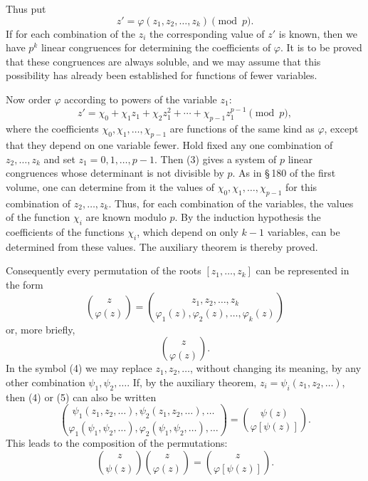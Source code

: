 \documentclass[11pt]{article}
\begin{document}
Thus put
\begin{equation}
 z'=\varphi(z_1,z_2,\ldots,z_k)\pmod p.
 \tag{2}
\end{equation}
If for each combination of the $z_i$ the corresponding value of $z'$ is known, then we have $p^k$ linear congruences for determining the coefficients of $\varphi$. It is to be proved that these congruences are always soluble, and we may assume that this possibility has already been established for functions of fewer variables.

Now order $\varphi$ according to powers of the variable $z_1$:
\begin{equation}
 z'=\chi_0+\chi_1z_1+\chi_2z_1^2+\cdots+\chi_{p-1}z_1^{p-1}\pmod p,
 \tag{3}
\end{equation}
where the coefficients $\chi_0,\chi_1,\ldots,\chi_{p-1}$ are functions of the same kind as $\varphi$, except that they depend on one variable fewer. Hold fixed any one combination of $z_2,\ldots,z_k$ and set $z_1=0,1,\ldots,p-1$. Then (3) gives a system of $p$ linear congruences whose determinant is not divisible by $p$. As in \S\,180 of the first volume, one can determine from it the values of $\chi_0,\chi_1,\ldots,\chi_{p-1}$ for this combination of $z_2,\ldots,z_k$. Thus, for each combination of the variables, the values of the function $\chi_i$ are known modulo $p$. By the induction hypothesis the coefficients of the functions $\chi_i$, which depend on only $k-1$ variables, can be determined from these values. The auxiliary theorem is thereby proved.

Consequently every permutation of the roots $[z_1,\ldots,z_k]$ can be represented in the form
\begin{equation}
 \binom{z}{\varphi(z)}
 =
 \binom{z_1,z_2,\ldots,z_k}{\varphi_1(z),\varphi_2(z),\ldots,\varphi_k(z)}
 \tag{4}
\end{equation}
or, more briefly,
\begin{equation}
 \binom{z}{\varphi(z)}.
 \tag{5}
\end{equation}
In the symbol (4) we may replace $z_1,z_2,\ldots$, without changing its meaning, by any other combination $\psi_1,\psi_2,\ldots$. If, by the auxiliary theorem, $z_i=\psi_i(z_1,z_2,\ldots)$, then (4) or (5) can also be written
\begin{equation}
 \binom{\psi_1(z_1,z_2,\ldots),\psi_2(z_1,z_2,\ldots),\ldots}
       {\varphi_1(\psi_1,\psi_2,\ldots),\varphi_2(\psi_1,\psi_2,\ldots),\ldots}
 =
 \binom{\psi(z)}{\varphi[\psi(z)]}.
 \tag{6}
\end{equation}
This leads to the composition of the permutations:
\begin{equation}
 \binom{z}{\psi(z)}\binom{z}{\varphi(z)}
 =
 \binom{z}{\varphi[\psi(z)]}.
 \tag{7}
\end{equation}
\end{document}

